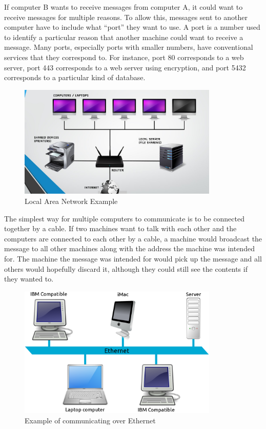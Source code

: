 If computer B wants to receive messages from computer A, it could want to receive messages for multiple reasons. To allow this, messages sent to another computer have to include what “port” they want to use. A port is a number used to identify a particular reason that another machine could want to receive a message. Many ports, especially ports with smaller numbers, have conventional services that they correspond to. For instance, port 80 corresponds to a web server, port 443 corresponds to a web server using encryption, and port 5432 corresponds to a particular kind of database. \\

\begin{figure}
	\centering
	\includegraphics[width=0.85\textwidth]{lectures/images/lanExample.png}
	\caption{Local Area Network Example}
	\label{fig:windows:file}
\end{figure}

The simplest way for multiple computers to communicate is to be connected together by a cable. If two machines want to talk with each other and the computers are connected to each other by a cable, a machine would broadcast the message to all other machines along with the address the machine was intended for. The machine the message was intended for would pick up the message and all others would hopefully discard it, although they could still see the contents if they wanted to. \\

\begin{figure}
	\centering
	\includegraphics[width=0.85\textwidth]{lectures/images/ethernetExample.png}
	\caption{Example of communicating over Ethernet}
	\label{fig:windows:file}
\end{figure}

